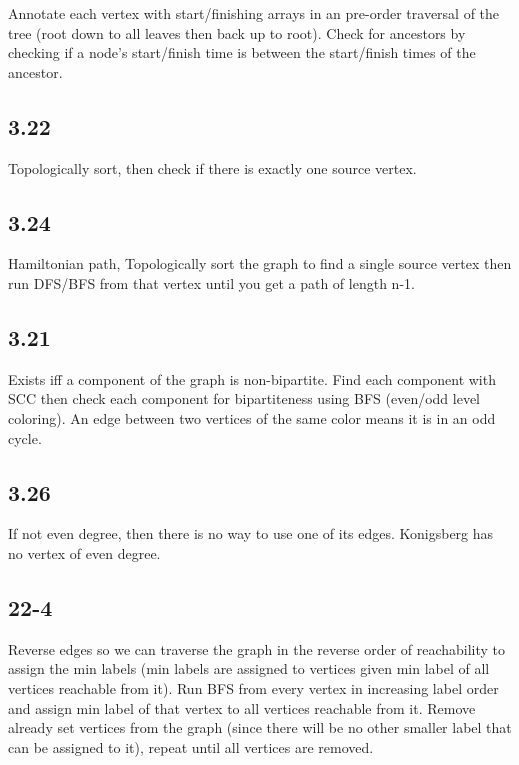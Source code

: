 \documentclass[11pt]{article}
\begin{document}
Annotate each vertex with start/finishing arrays in an pre-order traversal of the tree (root down to all leaves then back up to root). Check for ancestors by checking if a node's start/finish time is between the start/finish times of the ancestor.

\subsection{3.22}

Topologically sort, then check if there is exactly one source vertex.

\subsection{3.24}

Hamiltonian path, Topologically sort the graph to find a single source vertex then run DFS/BFS from that vertex until you get a path of length n-1.

\subsection{3.21}

Exists iff a component of the graph is non-bipartite. Find each component with SCC then check each component for bipartiteness using BFS (even/odd level coloring). An edge between two vertices of the same color means it is in an odd cycle.

\subsection{3.26}

If not even degree, then there is no way to use one of its edges. Konigsberg has no vertex of even degree.

\subsection{22-4}

Reverse edges so we can traverse the graph in the reverse order of reachability to assign the min labels (min labels are assigned to vertices given min label of all vertices reachable from it). Run BFS from every vertex in increasing label order and assign min label of that vertex to all vertices reachable from it. Remove already set vertices from the graph (since there will be no other smaller label that can be assigned to it), repeat until all vertices are removed.
\end{document}
